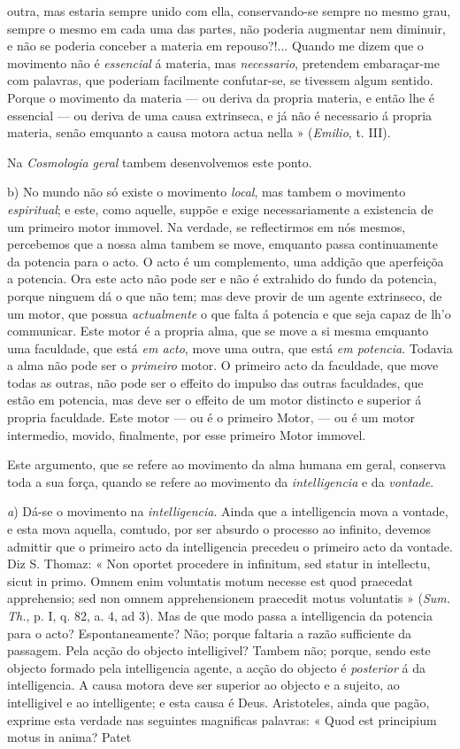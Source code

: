 outra, mas estaria sempre unido com ella, conservando-se sempre no mesmo grau, sempre o mesmo em cada uma das partes, não poderia augmentar nem diminuir, e não se poderia conceber a materia em repouso?!... Quando me dizem que o movimento não é \emph{essencial} á materia, mas \emph{necessario}, pretendem embaraçar-me com palavras, que poderiam facilmente confutar-se, se tivessem algum sentido. Porque o movimento da materia --- ou deriva da propria materia, e então lhe é essencial --- ou deriva de uma causa extrinseca, e já não é necessario á propria materia, senão emquanto a causa motora actua nella » (\emph{Emilio}, t. III).\par Na \emph{Cosmologia geral} tambem desenvolvemos este ponto.\par b) No mundo não só existe o movimento \emph{local}, mas tambem o movimento \emph{espiritual}; e este, como aquelle, suppõe e exige necessariamente a existencia de um primeiro motor immovel. Na verdade, se reflectirmos em nós mesmos, percebemos que a nossa alma tambem se move, emquanto passa continuamente da potencia para o acto. O acto é um complemento, uma addição que aperfeiçõa a potencia. Ora este acto não pode ser e não é extrahido do fundo da potencia, porque ninguem dá o que não tem; mas deve provir de um agente extrinseco, de um motor, que possua \emph{actualmente} o que falta á potencia e que seja capaz de lh'o communicar. Este motor é a propria alma, que se move a si mesma emquanto uma faculdade, que está \emph{em acto}, move uma outra, que está \emph{em potencia}. Todavia a alma não pode ser o \emph{primeiro} motor. O primeiro acto da faculdade, que move todas as outras, não pode ser o effeito do impulso das outras faculdades, que estão em potencia, mas deve ser o effeito de um motor distincto e superior á propria faculdade. Este motor --- ou é o primeiro Motor, --- ou é um motor intermedio, movido, finalmente, por esse primeiro Motor immovel.\par Este argumento, que se refere ao movimento da alma humana em geral, conserva toda a sua força, quando se refere ao movimento da \emph{intelligencia} e da \emph{vontade}.\par \emph{a}) Dá-se o movimento na \emph{intelligencia}. Ainda que a intelligencia mova a vontade, e esta mova aquella, comtudo, por ser absurdo o processo ao infinito, devemos admittir que o primeiro acto da intelligencia precedeu o primeiro acto da vontade. Diz S. Thomaz: « Non oportet procedere in infinitum, sed statur in intellectu, sicut in primo. Omnem enim voluntatis motum necesse est quod praecedat apprehensio; sed non omnem apprehensionem praecedit motus voluntatis » (\emph{Sum. Th.}, p. I, q. 82, a. 4, ad 3). Mas de que modo passa a intelligencia da potencia para o acto? Espontaneamente? Não; porque faltaria a razão sufficiente da passagem. Pela acção do objecto intelligivel? Tambem não; porque, sendo este objecto formado pela intelligencia agente, a acção do objecto é \emph{posterior} á da intelligencia. A causa motora deve ser superior ao objecto e a sujeito, ao intelligivel e ao intelligente; e esta causa é Deus. Aristoteles, ainda que pagão, exprime esta verdade nas seguintes magnificas palavras: « Quod est principium motus in anima? Patet 